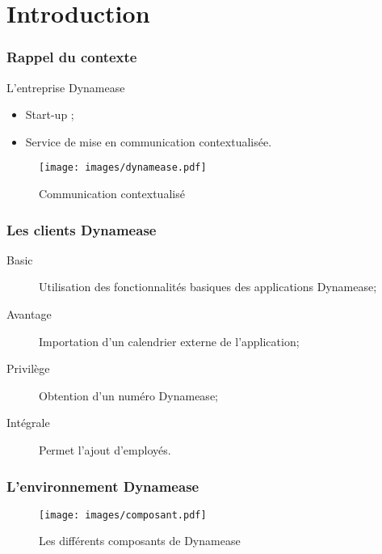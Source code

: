 \section{Introduction}
\author{Kévin Moreau}


\begin{frame}
	\frametitle{Rappel du contexte}

	\begin{block}{L'entreprise Dynamease}
	 \begin{itemize}
      \item Start-up ;
	  \item Service de mise en communication contextualisée.
	 \end{itemize}
	\end{block}

    \begin{center}
	  \begin{figure}
        \texttt{[image: images/dynamease.pdf]}
	   \caption{Communication contextualisé}
	  \end{figure}
	\end{center}
\end{frame}

\begin{frame}
	\frametitle{Les clients Dynamease}

    \begin{description}
    	\item[Basic] Utilisation des fonctionnalités basiques des applications Dynamease;
    	\item[Avantage] Importation d'un calendrier externe de l'application;
    	\item[Privilège] Obtention d'un numéro Dynamease;
    	\item[Intégrale] Permet l'ajout d'employés.
    \end{description}

\end{frame}

\begin{frame}
	\frametitle{L'environnement Dynamease}

    \begin{center}
	  \begin{figure}
        \texttt{[image: images/composant.pdf]}
	   \caption{Les différents composants de Dynamease}
	  \end{figure}
	\end{center}

\end{frame}


